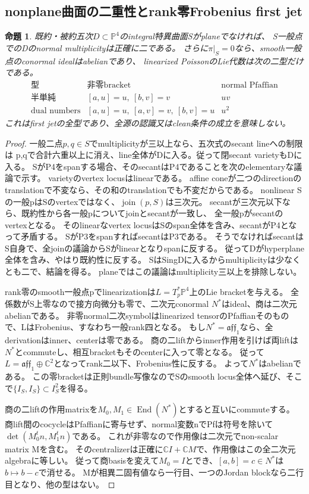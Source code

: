 \documentclass[a4paper,11pt]{ltjsarticle}
\newtheorem{proposition}{命題}[section]
\theoremstyle{definition}
\begin{document}
\subsection{nonplane曲面の二重性とrank零Frobenius first jet}
\begin{proposition}\label{prop:nonplane-double-first-jet}
既約・被約五次$D\subset\mathbb P^4$のintegral特異曲面Sがplaneでなければ、
S一般点でのDのnormal multiplicityは正確に二である。
さらに$\pi|_S=0$なら、smooth一般点のconormal idealはabelianであり、
linearized PoissonのLie代数は次の二型だけである。
\[
\begin{array}{c|l|c}
 \text{型}&\text{非零bracket}&\text{normal Pfaffian}\\\hline
 \text{半単純}&[a,u]=u,\ [b,v]=v&uv\\
 \text{dual numbers}&[a,u]=u,\ [a,v]=v,\ [b,v]=u&u^2
\end{array}
\]
これはfirst jetの全型であり、全源の認識又はclean条件の成立を意味しない。
\end{proposition}
\begin{proof}
一般二点$p,q\in S$でmultiplicityが三以上なら、五次式のsecant lineへの制限は
p,qで合計六重以上に消え、line全体がDに入る。従って閉secant varietyもDに入る。
SがP4をspanする場合、そのsecantはP4であることを次のelementaryな議論で示す。
varietyのvertex locusはlinearである。
affine coneが二つのdirectionのtranslationで不変なら、その和のtranslationでも不変だからである。
nonlinear Sの一般pはSのvertexではなく、$\operatorname{join}(p,S)$は三次元。
secantが三次元以下なら、既約性から各一般pについてjoinとsecantが一致し、
全一般pがsecantのvertexとなる。
そのlinearなvertex locusはSのspan全体を含み、secantがP4となって矛盾する。
SがP3をspanすればsecantはP3である。
そうでなければsecantはS自身で、全joinの議論からSがlinearとなりspanに反する。
従ってDがhyperplane全体を含み、やはり既約性に反する。
SはSingDに入るからmultiplicityは少なくとも二で、結論を得る。
planeではこの議論はmultiplicity三以上を排除しない。

rank零のsmooth一般点pでlinearizationは$L=T_p^*\mathbb P^4$上のLie bracketを与える。
全係数がS上零なので接方向微分も零で、二次元conormal $N^*$はideal、商は二次元abelianである。
非零normal二次symbolはlinearized tensorのPfaffianそのもので、LはFrobenius、すなわち一般rank四となる。
もし$N^*=\mathfrak{aff}_1$なら、全derivationはinner、centerは零である。
商の二liftからinner作用を引けば両liftは$N^*$とcommuteし、相互bracketもそのcenterに入って零となる。
従って$L=\mathfrak{aff}_1\oplus\mathbb C^2$となってrank二以下、Frobenius性に反する。
よって$N^*$はabelianである。
この零bracketは正則bundle写像なのでSのsmooth locus全体へ延び、そこで$\{I_S,I_S\}\subset I_S^2$を得る。

商の二liftの作用matrixを$M_0,M_1\in\operatorname{End}(N^*)$とすると互いにcommuteする。
商lift間のcocycleはPfaffianに寄与せず、normal変数nでPfは符号を除いて
$\det(M_0^tn,M_1^tn)$である。
これが非零なので作用像は二次元でnon-scalar matrix Mを含む。
そのcentralizerは正確に$\mathbb C I+\mathbb C M$で、作用像はこの全二次元algebraに等しい。
従って商basisを変えて$M_0=I$とでき、$[a,b]=c\in N^*$は$b\mapsto b-c$で消せる。
Mが相異二固有値なら一行目、一つのJordan blockなら二行目となり、他の型はない。
\end{proof}
\end{document}
